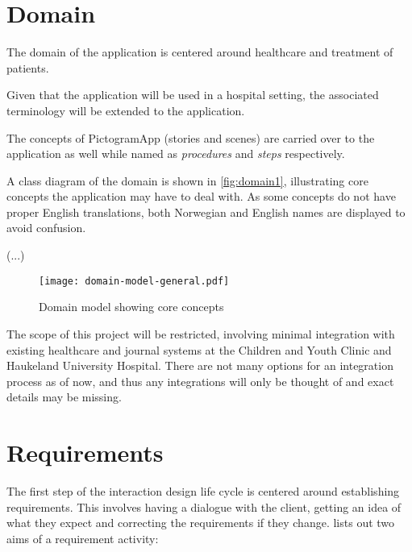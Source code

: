 
\section{Domain}
\label{sec:domain}

The domain of the application is centered around healthcare and treatment of patients.


Given that the application will be used in a hospital setting, the associated terminology will be extended to the application.

The concepts of PictogramApp (stories and scenes) are carried over to the application as well while named as \emph{procedures} and \emph{steps} respectively.

A class diagram of the domain is shown in \autoref{fig:domain1}, illustrating core concepts the application may have to deal with. As some concepts do not have proper English translations, both Norwegian and English names are displayed to avoid confusion.

(...)


\begin{figure}
    \centering
    \texttt{[image: domain-model-general.pdf]}
    \caption{Domain model showing core concepts}
    \label{fig:domain1}
\end{figure}

The scope of this project will be restricted, involving minimal integration with existing healthcare and journal systems at the Children and Youth Clinic and Haukeland University Hospital. There are not many options for an integration process as of now, and thus any integrations will only be thought of and exact details may be missing.

\section{Requirements}
\label{sec:requirements}

The first step of the interaction design life cycle is centered around establishing requirements. This involves having a dialogue with the client, getting an idea of what they expect and correcting the requirements if they change. \textcite{preece2015} lists out two aims of a requirement activity:

